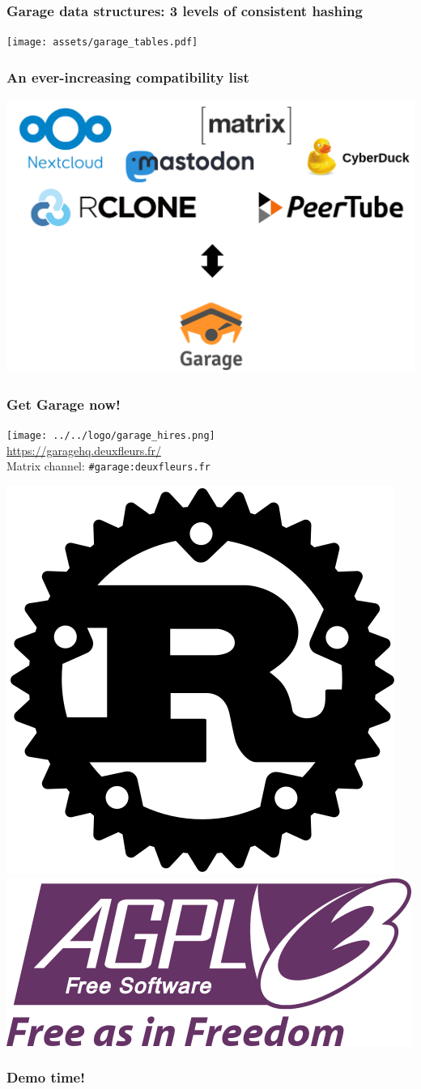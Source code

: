 \documentclass[aspectratio=169]{beamer}
\begin{document}
\begin{frame}
	\frametitle{Garage data structures: 3 levels of consistent hashing}
	\centering
	\texttt{[image: assets/garage\_tables.pdf]}
\end{frame}

\begin{frame}
	\frametitle{An ever-increasing compatibility list}
		\begin{center}
			\includegraphics[width=.7\linewidth]{assets/compatibility.png}
		\end{center}
\end{frame}

\begin{frame}
	\frametitle{Get Garage now!}
	\begin{center}
			\texttt{[image: ../../logo/garage\_hires.png]}\\
			\vspace{-1em}
		\url{https://garagehq.deuxfleurs.fr/}\\
		Matrix channel: \texttt{\#garage:deuxfleurs.fr}

		\vspace{2em}
			\includegraphics[width=.09\linewidth]{assets/rust_logo.png}
			\includegraphics[width=.2\linewidth]{assets/AGPLv3_Logo.png}
	\end{center}
\end{frame}

\begin{frame}
	\frametitle{Demo time!}
\end{frame}
\end{document}
